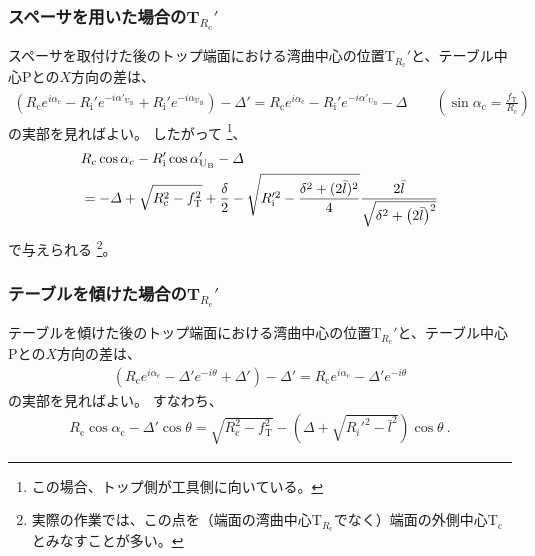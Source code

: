 \subsubsection{スペーサを用いた場合のT\texorpdfstring{$_{R_\mathrm c}'$}{Rc'}}
スペーサを取付けた後のトップ端面における湾曲中心の位置T$_{R_\mathrm c}'$と、テーブル中心Pとの$X$方向の差は、
\begin{align*}
  \left(
    R_\mathrm ce^{i\alpha_\mathrm c}
    -R_\mathrm i'e^{-i\alpha'_{\mathrm U_\mathrm B}}
    +R_\mathrm i'e^{-i\alpha_{\mathrm U_\mathrm B}}
  \right)
  -\varDelta'
  = R_\mathrm ce^{i\alpha_\mathrm c}-R_\mathrm i'e^{-i\alpha'_{\mathrm U_\mathrm B}}-\varDelta \qquad
    \left(\sin\alpha_\mathrm c = \frac{f_\mathrm T}{R_\mathrm c}\right)
\end{align*}
の実部を見ればよい。
したがって
\footnote{この場合、トップ側が工具側に向いている。}、
\begin{align}
  \notag
  &  R_\mathrm c\cos\alpha_\mathrm c-R_\mathrm i'\cos\alpha'_{\mathrm U_\mathrm B}-\varDelta\\
  &= -\varDelta+\sqrt{R_\mathrm c^2-f_\mathrm T^2}+\frac\delta2
     -\sqrt{R_\mathrm i'^2-\frac{\delta^2+(2\bar l)^2}4}
      \frac{2\bar l}{\sqrt{\delta^2+\left(2\bar l\right)^2}}
     \label{eq:spacerTRc}
\end{align}
で与えられる
\footnote{実際の作業では、この点を（端面の湾曲中心T$_{R_\mathrm c}\!$でなく）端面の外側中心T$_\mathrm c$とみなすことが多い。}。


\subsubsection{テーブルを傾けた場合のT\texorpdfstring{$_{R_\mathrm c}'$}{Rc'}}
テーブルを傾けた後のトップ端面における湾曲中心の位置T$_{R_\mathrm c}'$と、テーブル中心Pとの$X$方向の差は、
\begin{align*}
  \left(R_\mathrm ce^{i\alpha_\mathrm c}-\varDelta'e^{-i\theta}+\varDelta'\right)-\varDelta'
  = R_\mathrm ce^{i\alpha_\mathrm c}-\varDelta'e^{-i\theta}
\end{align*}
の実部を見ればよい。
すなわち、
\begin{align}
  \label{eq:tableTRc}
  R_\mathrm c\cos\alpha_\mathrm c-\varDelta'\cos\theta
  = \sqrt{R_\mathrm c^2-f_\mathrm T^2}-\left(\varDelta+\sqrt{R_i'^2-\bar l^2}\right)\!\cos\theta~.
\end{align}




